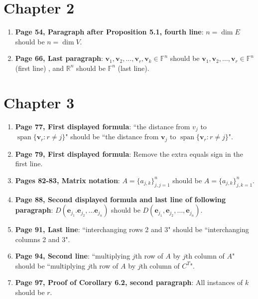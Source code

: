 \documentclass{article}
\begin{document}
\section*{Chapter 2}
\begin{enumerate}[leftmargin=*]
    \item \textbf{Page 54, Paragraph after Proposition 5.1, fourth line}: 
          $n=\dim E$ should be $n=\dim V$.
    
    \item \textbf{Page 66, Last paragraph}: 
          $\mathbf{v}_1,\mathbf{v}_2,\ldots,\mathbf{v}_r,\mathbf{v}_k\in\mathbb{F}^n$ should be 
          $\mathbf{v}_1,\mathbf{v}_2,\ldots,\mathbf{v}_r\in\mathbb{F}^n$ (first line) , and
          $\mathbb{R}^n$ should be $\mathbb{F}^n$ (last line).
\end{enumerate}

\section*{Chapter 3}
\begin{enumerate}[leftmargin=*]
    \item \textbf{Page 77, First displayed formula}: 
          ``the distance from $v_j$ to $\operatorname{span}\{\mathbf{v}_r : r \ne j\}$" should be 
          ``the distance from $\mathbf{v}_j$ to $\operatorname{span}\{\mathbf{v}_r : r \ne j\}$".
    
    \item \textbf{Page 79, First displayed formula}: 
          Remove the extra equals sign in the first line.
    
    \item \textbf{Pages 82-83, Matrix notation}: 
          $A=\{a_{j,k}\}_{j,j=1}^{n}$ should be $A=\{a_{j,k}\}_{j,k=1}^{n}$.
    
    \item \textbf{Page 88, Second displayed formula and last line of following paragraph}: 
          $D(\mathbf{e}_{j_1}.\mathbf{e}_{j_2},\ldots\mathbf{e}_{j_n})$ should be 
          $D(\mathbf{e}_{j_1},\mathbf{e}_{j_2},\ldots,\mathbf{e}_{j_n})$.
    
    \item \textbf{Page 91, Last line}: 
          ``interchanging rows 2 and 3" should be ``interchanging columns 2 and 3".
    
    \item \textbf{Page 94, Second line}: 
          ``multiplying $j$th row of $A$ by $j$th column of $A$" should be 
          ``multiplying $j$th row of $A$ by $j$th column of $C^T$".
    
    \item \textbf{Page 97, Proof of Corollary 6.2, second paragraph}: 
          All instances of $k$ should be $r$.
\end{enumerate}
\end{document}

